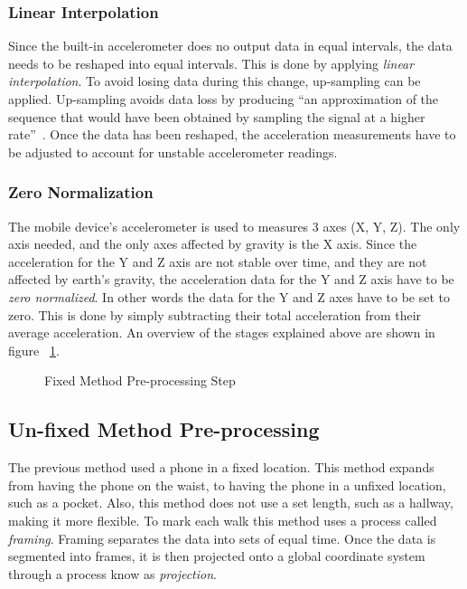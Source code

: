\documentclass{sig-alternate}
\begin{document}
\subsubsection{Linear Interpolation} \label{LI}
	Since the built-in accelerometer does no output data in equal intervals, the data needs to be reshaped into equal intervals. This is done by applying \textit{linear interpolation}. To avoid losing data during this change, up-sampling can be applied. Up-sampling avoids data loss by producing ``an approximation of the sequence that would have been obtained by sampling the signal at a higher rate''~\cite{wiki1:2014}. Once the data has been reshaped, the acceleration measurements have to be adjusted to account for unstable accelerometer readings. 
			
\subsubsection{Zero Normalization}
	The mobile device's accelerometer is used to measures 3 axes (X, Y, Z). The only axis needed, and the only axes affected by gravity is the X axis. Since the acceleration for the Y and Z axis are not stable over time, and they are not affected by earth's gravity, the acceleration data for the Y and Z axis have to be \textit{zero normalized}. In other words the data for the Y and Z axes have to be set to zero. This is done by simply subtracting their total acceleration from their average acceleration. An overview of the stages explained above are shown in figure ~\ref{fig:firstStep}.
	
\begin{figure}
\centering
{}
\caption{Fixed Method Pre-processing Step}
\label{fig:firstStep}
\end{figure}

	
\subsection{Un-fixed Method Pre-processing}{
	The previous method used a phone in a fixed location. This method expands from having the phone on the waist, to having the phone in a unfixed location, such as a pocket. Also, this method does not use a set length, such as a hallway, making it more flexible. To mark each walk this method uses a process called \textit{framing}. Framing separates the data into sets of equal time. Once the data is segmented into frames, it is then projected onto a global coordinate system through a process know as \textit{projection}.}
		
\end{document}
